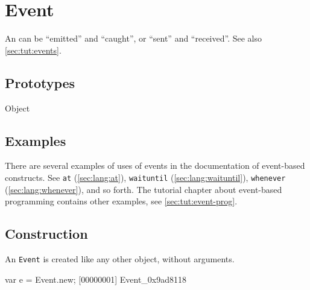 
\section{Event}

An  can be ``emitted'' and ``caught'', or ``sent'' and
``received''.  See also \autoref{sec:tut:events}.

\subsection{Prototypes}
\begin{refObjects}
\item[Object]
\end{refObjects}

\subsection{Examples}

There are several examples of uses of events in the documentation of
event-based constructs.  See \lstinline{at} (\autoref{sec:lang:at}),
\lstinline{waituntil} (\autoref{sec:lang:waituntil}),
\lstinline{whenever} (\autoref{sec:lang:whenever}), and so forth.  The
tutorial chapter about event-based programming contains other
examples, see \autoref{sec:tut:event-prog}.

\subsection{Construction}
\label{sec:stdlib:event:ctor}

An \lstinline{Event} is created like any other object, without
arguments.

\begin{urbiscript}[firstnumber=1]
var e = Event.new;
[00000001] Event_0x9ad8118
\end{urbiscript}

